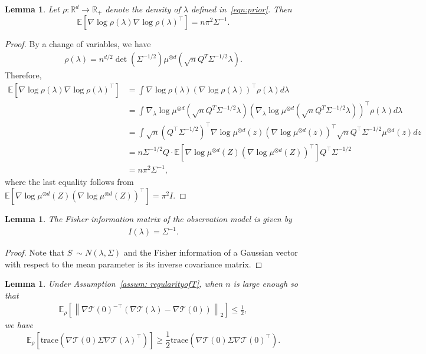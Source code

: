 \documentclass[11pt,twoside]{article}
\numberwithin{equation}{section}
\newcommand{\norm}[1] {\left \| #1 \right \|}
\newcommand{\EE}{\mathbb{E}}
\newcommand{\trace}[1]{\mathrm{trace}\left(#1\right)}
\newcommand{\RR}{\mathbb{R}}
\newcommand{\cT}{\mathcal{T}}
\newcommand{\1}{\mathbf{1}}
\newtheorem{lemma}[theorem]{Lemma}
\newcommand{\paren}[1]{ \left( #1 \right) }
\theoremstyle{remark}
\theoremstyle{plain}
\begin{document}
\begin{lemma}\label{lem: nablalog}
Let $\rho:\RR^d \rightarrow \RR_+$ denote the density of $\lambda$ defined in~\eqref{eqn:prior}. Then 
$$
\EE[\nabla \log \rho(\lambda) \nabla \log \rho(\lambda)^\top ] = n\pi^2 \Sigma^{-1}.
$$
\end{lemma}
\begin{proof}
By a change of variables, we have 
\begin{align*}
	\rho(\lambda) = n^{d/2} \det(  \Sigma^{-1/2}) \mu^{\otimes d}(\sqrt{n} Q^{T} \Sigma^{-1/2} \lambda).
\end{align*}
Therefore,
\begin{align*}
	\EE[\nabla \log \rho(\lambda) \nabla \log \rho(\lambda)^\top ] &= \int \nabla \log \rho(\lambda) \paren{\nabla \log \rho(\lambda)}^\top  \rho(\lambda) d\lambda \\
	&= \int \nabla_\lambda \log \mu^{\otimes d}(\sqrt{n} Q^{T} \Sigma^{-1/2} \lambda) \paren{ \nabla_\lambda \log \mu^{\otimes d}(\sqrt{n} Q^{T} \Sigma^{-1/2} \lambda)}^{\top}  \rho(\lambda) d\lambda \\
	&= \int \sqrt{n} (Q^{\top} \Sigma^{-1/2})^\top \nabla \log \mu^{\otimes d}(z)\paren{ \nabla \log \mu^{\otimes d}(z)} ^\top  \sqrt{n} Q^{\top} \Sigma^{-1/2}  \mu^{\otimes d}(z) dz \\
	&= n \Sigma^{-1/2} Q \cdot \EE[\nabla \log \mu^{\otimes d}(Z) \paren{\nabla \log \mu^{\otimes d}(Z)}^\top] Q^\top \Sigma^{-1/2}\\
	&= n\pi^2 \Sigma^{-1},
\end{align*}
where the last equality follows from  $ \EE[\nabla \log \mu^{\otimes d}(Z) \paren{\nabla \log \mu^{\otimes d}(Z)}^\top] = \pi^2 I$.
\end{proof}
\begin{lemma}\label{lem: Fisherinfo:lambda}
The Fisher information matrix of the observation model is given by
\begin{align*}
	I(\lambda) = \Sigma^{-1}.
\end{align*}
\end{lemma}
\begin{proof}
Note that $S~\sim N(\lambda,\Sigma)$ and the Fisher information of a Gaussian vector with respect to the mean parameter is its inverse covariance matrix.
\end{proof}
\begin{lemma}\label{lem: tracelb}
Under Assumption~\ref{assum: regularityofT}, when $n$ is large enough so that 
\begin{align}\label{eqn: distg(lambda)} 
	\EE_{\rho}\left[\norm{\nabla \cT(0)^{-\top} (\nabla \cT(\lambda) - \nabla \cT(0))}_2\right] \le \frac{1}{2},
\end{align} 
we have 
$$
\EE_\rho\left[\trace{\nabla \cT(0) \Sigma \nabla \cT(\lambda)^\top}\right]
\ge  \frac{1}{2} \trace{\nabla \cT(0) \Sigma \nabla \cT(0)^\top}.
$$
\end{lemma}
\end{document}
